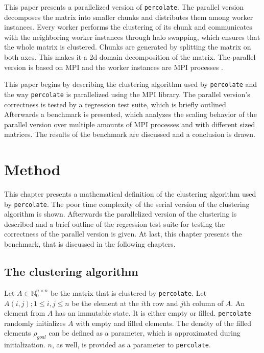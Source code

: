\documentclass[twoside,11pt]{article}
\def\perc{\texttt{perco\-late}}
\begin{document}
This paper presents a parallelized version of \perc{}.
The parallel version decomposes the matrix into smaller
chunks and distributes them among worker instances.
Every worker performs the clustering of its chunk and
communicates with the neighboring worker
instances through halo swapping, which ensures that the
whole matrix is clustered.
Chunks are generated by splitting the matrix on both axes.
This makes it a 2d domain decomposition of the matrix.
The parallel version is based on MPI and the worker
instances are MPI processes \citep[see][]{mpi}.

This paper begins by describing the clustering algorithm
used by \perc{} and the way \perc{} is parallelized using
the MPI library.
The parallel version's correctness is tested by a
regression test suite, which is briefly outlined.
Afterwards a benchmark is presented, which analyzes the
scaling behavior of the parallel version over multiple
amounts of MPI processes and with different sized matrices.
The results of the benchmark are discussed and a conclusion
is drawn.


\section{Method} %

This chapter presents a mathematical definition of the
clustering algorithm used by \perc{}.
The poor time complexity of the serial version of the
clustering algorithm is shown.
Afterwards the parallelized version of the clustering is
described and a brief outline of the regression test suite
for testing the correctness of the parallel version is
given.
At last, this chapter presents the benchmark, that is
discussed in the following chapters.


\subsection{The clustering algorithm}

Let $A \in \mathbb{N}_0^{n \times n}$ be the matrix that
is clustered by \perc{}.
Let $A(i, j);1\leq i, j \leq n$ be the element at the
$i$th row and $j$th column of $A$.
An element from $A$ has an immutable state. It is either
empty or filled.
\perc{} randomly initializes $A$ with empty and filled
elements.
The density of the filled elements $\rho_{goal}$ can be
defined as a parameter, which is approximated during
initialization. $n$, as well, is provided as a parameter to
\perc{}.
\end{document}
